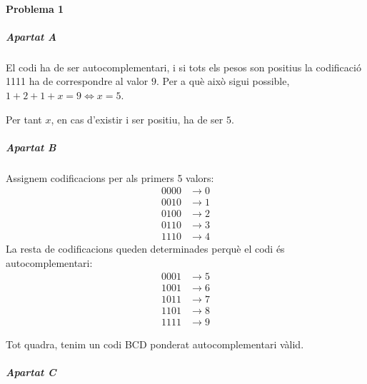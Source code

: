 



\startpage
\paragraph{Problema 1}

\subparagraph{Apartat A}

El codi ha de ser autocomplementari, i si tots els pesos son positius la codificació 1111 ha de correspondre al valor $9$.
Per a què això sigui possible, $1 + 2 + 1 + x = 9 \Leftrightarrow x = 5$.

Per tant $x$, en cas d'existir i ser positiu, ha de ser $5$.

\subparagraph{Apartat B}

Assignem codificacions per als primers 5 valors:
%
\begin{align*}
  0000 &\rightarrow 0 \\
  0010 &\rightarrow 1 \\
  0100 &\rightarrow 2 \\
  0110 &\rightarrow 3 \\
  1110 &\rightarrow 4
\end{align*}
%
La resta de codificacions queden determinades perquè el codi és autocomplementari:
%
\begin{align*}
  0001 &\rightarrow 5 \\
  1001 &\rightarrow 6 \\
  1011 &\rightarrow 7 \\
  1101 &\rightarrow 8 \\
  1111 &\rightarrow 9
\end{align*}

Tot quadra, tenim un codi BCD ponderat autocomplementari vàlid.

\subparagraph{Apartat C}

